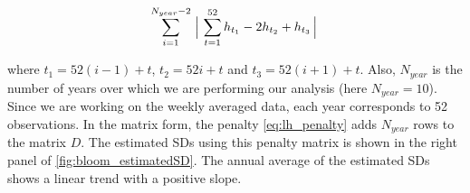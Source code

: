\documentclass{article}
\begin{document}
\begin{equation}
\sum_{i=1}^{N_{year}-2} \Big\arrowvert \sum_{t=1}^{52} h_{t_1}-2h_{t_2}+h_{t_3}  \Big\arrowvert
\label{eq:lh_penalty}
\end{equation}

where $t_1=52(i-1)+t$, $t_2=52i+t$ and $t_3=52(i+1)+t$. Also, $N_{year}$ is the number of years over which we are performing our analysis (here $N_{year}=10$). Since we are working on the weekly averaged data, each year corresponds to 52 observations. In the matrix form, the penalty \eqref{eq:lh_penalty} adds $N_{year}$ rows to the matrix $D$. The estimated SDs using this penalty matrix is shown in the right panel of \autoref{fig:bloom_estimatedSD}. The annual average of the estimated SDs shows a linear trend with a positive slope.


 


\small

\end{document}
